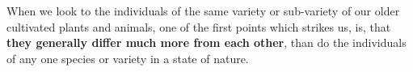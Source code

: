 When we look to the individuals of the same variety or sub-variety of our older cultivated plants and animals, one of the first points which strikes us, is, that \textbf{they generally differ much more from each other}, than do the individuals of any one species or variety in a state of nature.\\


